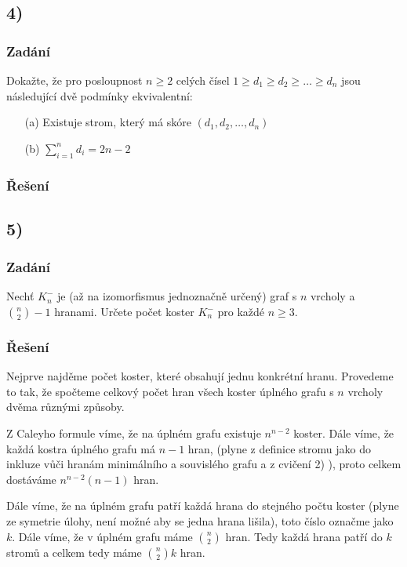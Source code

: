 \documentclass[../main.tex]{subfiles}
\begin{document}
\subsection{4)}
\subsubsection*{Zadání}

Dokažte, že pro posloupnost $n\geq 2$ celých čísel 
$1\geq d_1\geq d_2 \geq \dots \geq d_n$ jsou následující
dvě podmínky ekvivalentní:
\begin{enumerate}
    \item[(a)] Existuje strom, který má skóre $(d_1, d_2, \dots, d_n)$
    \item[(b)] $\sum_{i=1}^n d_i = 2n - 2$
\end{enumerate}


\subsubsection*{Řešení}


\subsection{5)}
\subsubsection*{Zadání}

Nechť $K_n^-$ je (až na izomorfismus jednoznačně určený) graf s $n$ vrcholy a $\binom{n}{2} -1$ hranami.
Určete počet koster $K_n^-$ pro každé $n\geq 3$.

\subsubsection*{Řešení}


Nejprve najděme počet koster, které obsahují jednu konkrétní hranu. 
Provedeme to tak, že spočteme celkový počet hran všech koster úplného grafu s $n$ vrcholy dvěma různými způsoby. 

Z Caleyho formule víme, že na úplném grafu existuje $n^{n-2}$ koster. Dále víme, že každá kostra úplného grafu má $n-1$ hran, 
(plyne z definice stromu jako do inkluze vůči hranám minimálního a souvislého grafu a z cvičení 2) ), proto celkem dostáváme $n^{n-2}(n-1)$ hran.

Dále víme, že na úplném grafu patří každá hrana do stejného počtu koster 
(plyne ze symetrie úlohy, není možné aby se jedna hrana lišila), toto číslo označme
jako $k$. Dále víme, že v úplném grafu máme $\binom{n}{2}$ hran. Tedy každá hrana patří do $k$ stromů a celkem tedy máme $\binom{n}{2}k$ hran.
\end{document}
